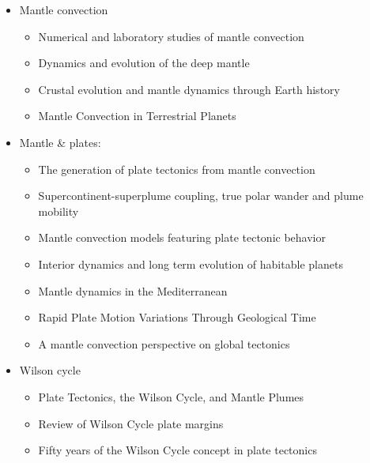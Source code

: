 \begin{itemize}
\item Mantle convection 

   \begin{itemize}
   \item [\twothousandfive] Numerical and laboratory studies of mantle convection \cite{taxn05}
   \item [\twothousandtwelve] Dynamics and evolution of the deep mantle  \cite{tack12}
   \item [\twothousandeighteen] Crustal evolution and mantle dynamics through Earth history \cite{kore18}
   \item [\twothousandtwenty] Mantle Convection in Terrestrial Planets \cite{mube20}
   \end{itemize}

\item Mantle \& plates:
   \begin{itemize}
   \item [\twothousandthree] The generation of plate tectonics from mantle convection \cite{berc03}
   \item [\twothousandnine] Supercontinent-superplume coupling, true polar wander and plume mobility \cite{lizh09}
   \item [\twothousandeleven] Mantle convection models featuring plate tectonic behavior \cite{lowm11}
   \item [\twothousandtwelve] Interior dynamics and long term evolution of habitable planets \cite{taab12}
   \item [\twothousandfourteen] Mantle dynamics in the Mediterranean \cite{faba14}
   \item [\twothousandfifteen] Rapid Plate Motion Variations Through Geological Time \cite{iabu15}
   \item [\twothousandseventeen] A mantle convection perspective on global tectonics \cite{cogu17}
   \end{itemize}

\item Wilson cycle
   \begin{itemize}
   \item [\twothousandeleven] Plate Tectonics, the Wilson Cycle, and Mantle Plumes \cite{burk11}
   \item [\twothousandfourteen] Review of Wilson Cycle plate margins \cite{buto14}
   \item [\twothousandnineteen] Fifty years of the Wilson Cycle concept in plate tectonics \cite{wihb19}
   \end{itemize}


\end{itemize}
